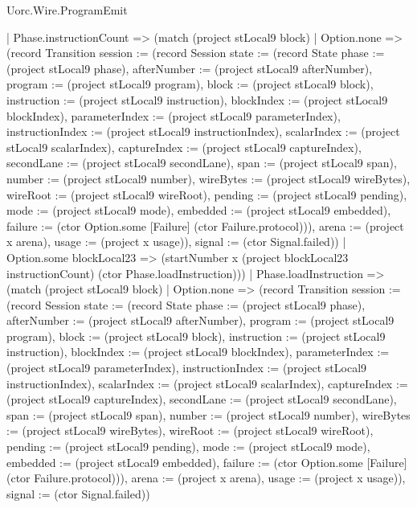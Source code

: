 \begin{lexlean}{Uorc.Wire.ProgramEmit}
\begin{semanticmodule}
{        | Phase.instructionCount => (match (project stLocal9 block)
          | Option.none => (record Transition {session := (record Session {state := (record State {phase := (project stLocal9 phase), afterNumber := (project stLocal9 afterNumber), program := (project stLocal9 program), block := (project stLocal9 block), instruction := (project stLocal9 instruction), blockIndex := (project stLocal9 blockIndex), parameterIndex := (project stLocal9 parameterIndex), instructionIndex := (project stLocal9 instructionIndex), scalarIndex := (project stLocal9 scalarIndex), captureIndex := (project stLocal9 captureIndex), secondLane := (project stLocal9 secondLane), span := (project stLocal9 span), number := (project stLocal9 number), wireBytes := (project stLocal9 wireBytes), wireRoot := (project stLocal9 wireRoot), pending := (project stLocal9 pending), mode := (project stLocal9 mode), embedded := (project stLocal9 embedded), failure := (ctor Option.some [Failure] (ctor Failure.protocol))}), arena := (project x arena), usage := (project x usage)}), signal := (ctor Signal.failed)})
          | Option.some blockLocal23 => (startNumber x (project blockLocal23 instructionCount) (ctor Phase.loadInstruction)))
        | Phase.loadInstruction => (match (project stLocal9 block)
          | Option.none => (record Transition {session := (record Session {state := (record State {phase := (project stLocal9 phase), afterNumber := (project stLocal9 afterNumber), program := (project stLocal9 program), block := (project stLocal9 block), instruction := (project stLocal9 instruction), blockIndex := (project stLocal9 blockIndex), parameterIndex := (project stLocal9 parameterIndex), instructionIndex := (project stLocal9 instructionIndex), scalarIndex := (project stLocal9 scalarIndex), captureIndex := (project stLocal9 captureIndex), secondLane := (project stLocal9 secondLane), span := (project stLocal9 span), number := (project stLocal9 number), wireBytes := (project stLocal9 wireBytes), wireRoot := (project stLocal9 wireRoot), pending := (project stLocal9 pending), mode := (project stLocal9 mode), embedded := (project stLocal9 embedded), failure := (ctor Option.some [Failure] (ctor Failure.protocol))}), arena := (project x arena), usage := (project x usage)}), signal := (ctor Signal.failed)})
}
\end{semanticmodule}
\end{lexlean}
